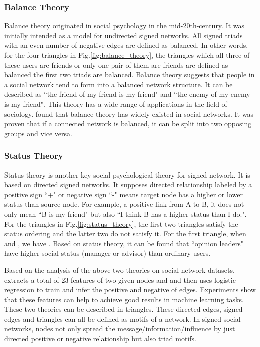 \documentclass[runningheads]{llncs}
\begin{document}
\subsubsection{Balance Theory}

Balance theory originated in social psychology in the mid-20th-century\cite{heider1946attitudes}.
It was initially intended as a model for undirected signed networks. 
All signed triads with an even number of negative edges are defined as balanced. 
In other words, for the four triangles in Fig.\ref{fig:balance_theory}, the triangles which all three of these users are friends or only one pair of them are friends are defined as balanced \ie the first two triads are balanced.
Balance theory suggests that people in a social network tend to form into a balanced network structure. 
It can be described as ``the friend of my friend is my friend" and ``the enemy of my enemy is my friend".
This theory has a wide range of applications in the field of sociology. \cite{leskovec2010predicting} found that balance theory has widely existed in social networks. 
It was proven that if a connected network is balanced, it can be split into two opposing groups and vice versa\cite{easley2010networks}. 

\subsubsection{Status Theory}

Status theory is another key social psychological theory for signed network.
It is based on directed signed networks.
It supposes directed relationship labeled by a positive sign ``+" or negative sign ``-"  means target node has a higher or lower status than source node\cite{tang2012inferring}. 
For example, a positive link from A to B, it does not only mean ``B is my friend" but also ``I think B has a higher status than I do.".
For the triangles in Fig.\ref{fig:status_theory}, the first two triangles satisfy the status ordering and the latter two do not satisfy it. 
For the first triangle, when  and , we have . 
Based on status theory, it can be found that ``opinion leaders" have higher social status (manager or advisor) than ordinary users\cite{tang2012inferring}. 



Based on the analysis of the above two theories on social network datasets, \cite{leskovec2010predicting} extracts a total of 23 features of two given nodes  and  and then uses logistic regression to train and infer the positive and negative of edges. 
Experiments show that these features can help to achieve good results in machine learning tasks. 
These two theories can be described in triangles. These directed edges, signed edges and triangles can all be defined as motifs of a network\cite{milo2002network}. 
In signed social networks, nodes not only spread the message/information/influence by just directed positive or negative relationship but also triad motifs. 
\end{document}
